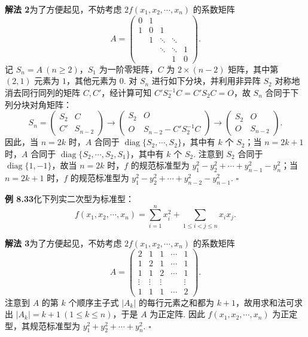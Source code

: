 \documentclass[UTF8, 12pt, fontset=fandol, oneside]{ctexart}
\begin{document}
\noindent\textbf{解法 2}\quad 为了方便起见，不妨考虑 $2f(x_1,x_2,\cdots,x_n)$ 的系数矩阵
\[
A=\left(\begin{array}{ccccc}
0 & 1 &        &        &   \\
1 & 0 & 1      &        &   \\
  & 1 & \ddots & \ddots &   \\
  &   & \ddots & \ddots & 1 \\
  &   &        & 1      & 0
\end{array}\right).
\]
记 $S_n=A\ (n\ge 2)$，$S_1$ 为一阶零矩阵，$C$ 为 $2\times(n-2)$ 矩阵，其中第 $(2,1)$ 元素为 $1$，其他元素为 $0$. 对 $S_n$ 进行如下分块，并利用非异阵 $S_2$ 对称地消去同行同列的矩阵 $C,C'$，经计算可知 $C'S_2^{-1}C=C'S_2C=O$，故 $S_n$ 合同于下列分块对角矩阵：
\[
S_n=\left(\begin{array}{cc}
S_2 & C\\
C' & S_{n-2}
\end{array}\right)
\to
\left(\begin{array}{cc}
S_2 & O\\
O & S_{n-2}-C'S_2^{-1}C
\end{array}\right)
\to
\left(\begin{array}{cc}
S_2 & O\\
O & S_{n-2}
\end{array}\right).
\]
因此，当 $n=2k$ 时，$A$ 合同于 $\operatorname{diag}\{S_2,\cdots,S_2\}$，其中有 $k$ 个 $S_2$；当 $n=2k+1$ 时，$A$ 合同于 $\operatorname{diag}\{S_2,\cdots,S_2,S_1\}$，其中有 $k$ 个 $S_2$. 注意到 $S_2$ 合同于 $\operatorname{diag}\{1,-1\}$，故当 $n=2k$ 时，$f$ 的规范标准型为 $y_1^2-y_2^2+\cdots+y_{n-1}^2-y_n^2$；当 $n=2k+1$ 时，$f$ 的规范标准型为 $y_1^2-y_2^2+\cdots+y_{n-2}^2-y_{n-1}^2$. $\ensuremath{\square}$

\noindent\textbf{例 8.33}\quad 化下列实二次型为标准型：
\[
f(x_1,x_2,\cdots,x_n)=\sum_{i=1}^n x_i^2+\sum_{1\le i<j\le n}x_ix_j.
\]

\noindent\textbf{解法 3}\quad 为了方便起见，不妨考虑 $2f(x_1,x_2,\cdots,x_n)$ 的系数矩阵
\[
A=\left(\begin{array}{ccccc}
2 & 1 & 1 & \cdots & 1\\
1 & 2 & 1 & \cdots & 1\\
1 & 1 & 2 & \cdots & 1\\
\vdots & \vdots & \vdots & & \vdots\\
1 & 1 & 1 & \cdots & 2
\end{array}\right).
\]
注意到 $A$ 的第 $k$ 个顺序主子式 $|A_k|$ 的每行元素之和都为 $k+1$，故用求和法可求出 $|A_k|=k+1\ (1\le k\le n)$，于是 $A$ 为正定阵. 因此 $f(x_1,x_2,\cdots,x_n)$ 为正定型，其规范标准型为 $y_1^2+y_2^2+\cdots+y_n^2$. $\ensuremath{\square}$
\end{document}
